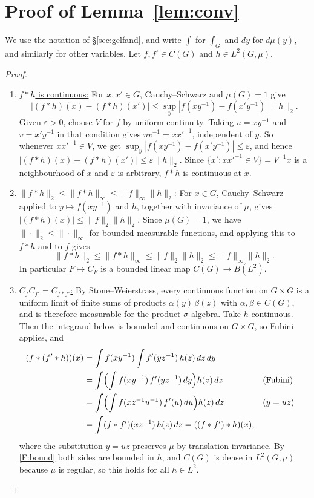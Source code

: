 \documentclass[11pt]{article}
\begin{document}
\section{Proof of Lemma~\ref{lem:conv}}\label{app:conv}

We use the notation of \S\ref{sec:gelfand}, and write $\int$ for $\int_G$ and $dy$ for $d\mu(y)$, and similarly for other variables. Let $f, f' \in C(G)$ and $h \in L^2(G, \mu)$.

\begin{proof}
\begin{enumerate}[label=(F\arabic*),leftmargin=*]
  \item\label{F:cont} \uline{$f * h$ is continuous:} For $x, x' \in G$, Cauchy--Schwarz and $\mu(G) = 1$ give
  \[
    |(f * h)(x) - (f * h)(x')| \le \sup_{y} |f(xy^{-1}) - f(x'y^{-1})|\, \|h\|_2.
  \]
  Given $\varepsilon > 0$, choose $V$ for $f$ by uniform continuity. Taking $u = xy^{-1}$ and $v = x'y^{-1}$ in that condition gives $uv^{-1} = xx'^{-1}$, independent of $y$. So whenever $xx'^{-1} \in V$, we get $\sup_y |f(xy^{-1}) - f(x'y^{-1})| \le \varepsilon$, and hence $|(f * h)(x) - (f * h)(x')| \le \varepsilon\|h\|_2$. Since $\{x' : xx'^{-1} \in V\} = V^{-1}x$ is a neighbourhood of $x$ and $\varepsilon$ is arbitrary, $f * h$ is continuous at $x$.

  \item\label{F:bound} \uline{$\|f * h\|_2 \le \|f * h\|_\infty \le \|f\|_\infty\|h\|_2$:} For $x \in G$, Cauchy--Schwarz applied to $y \mapsto f(xy^{-1})$ and $h$, together with invariance of $\mu$, gives $|(f * h)(x)| \le \|f\|_2\|h\|_2$. Since $\mu(G) = 1$, we have $\|\cdot\|_2 \le \|\cdot\|_\infty$ for bounded measurable functions, and applying this to $f * h$ and to $f$ gives
  \[
    \|f * h\|_2 \le \|f * h\|_\infty \le \|f\|_2\|h\|_2 \le \|f\|_\infty\|h\|_2.
  \]
  In particular $F \mapsto C_F$ is a bounded linear map $C(G) \to B(L^2)$.

  \item\label{F:mult} \uline{$C_f C_{f'} = C_{f*f'}$:} By Stone--Weierstrass, every continuous function on $G \times G$ is a uniform limit of finite sums of products $\alpha(y)\,\beta(z)$ with $\alpha, \beta \in C(G)$, and is therefore measurable for the product $\sigma$-algebra. Take $h$ continuous. Then the integrand below is bounded and continuous on $G \times G$, so Fubini applies, and
  \begin{align*}
    (f * (f' * h))(x) &= \int f(xy^{-1}) \int f'(yz^{-1})\,h(z)\,dz\,dy \\
    &= \int \Bigl(\int f(xy^{-1})\,f'(yz^{-1})\,dy\Bigr) h(z)\,dz && \text{(Fubini)} \\
    &= \int \Bigl(\int f(xz^{-1}u^{-1})\,f'(u)\,du\Bigr) h(z)\,dz && (y = uz) \\
    &= \int (f * f')(xz^{-1})\,h(z)\,dz = ((f * f') * h)(x),
  \end{align*}
  where the substitution $y = uz$ preserves $\mu$ by translation invariance. By \ref{F:bound} both sides are bounded in $h$, and $C(G)$ is dense in $L^2(G, \mu)$ because $\mu$ is regular, so this holds for all $h \in L^2$.


\end{enumerate}
\end{proof}
\end{document}
